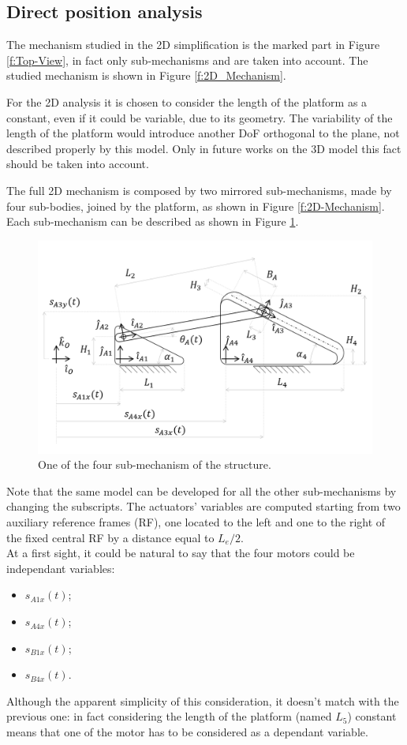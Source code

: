 \documentclass[10.5pt, twocolumn]{article}
\newcommand*\circled[1]{\tikz[baseline=(char.base)]{
  \node[shape=circle,draw,inner sep=2pt] (char) {#1};}}
\begin{document}
\subsection{Direct position analysis}
\label{s:Direct-position}
The mechanism studied in the 2D simplification is the marked part in Figure \ref{f:Top-View}, in fact only sub-mechanisms \circled{A} and \circled{B} are taken into account. The studied mechanism is shown in Figure \ref{f:2D_Mechanism}.

For the 2D analysis it is chosen to consider the length of the platform as a constant, even if it could be variable, due to its geometry. The variability of the length of the platform would introduce another DoF orthogonal to the plane, not described properly by this model. Only in future works on the 3D model this fact should be taken into account.

The full 2D mechanism is composed by two mirrored sub-mechanisms, made by four sub-bodies, joined by the platform, as shown in Figure \ref{f:2D-Mechanism}. Each sub-mechanism can be described as shown in Figure \ref{f:Sub-Mechanism}.
\begin{figure}[h!]
  \centering
  \includegraphics[width=12cm]{Images/Sub-Mechanism}
  \caption{One of the four sub-mechanism of the structure.}
  \label{f:Sub-Mechanism}
\end{figure}
Note that the same model can be developed for all the other sub-mechanisms by changing the subscripts.
The actuators' variables are computed starting from two auxiliary reference frames (RF), one located to the left and one to the right of the fixed central RF by a distance equal to \(L_e/2\).\\
At a first sight, it could be natural to say that the four motors could be independant variables:
\begin{itemize}
  \item \( s_{A1x}(t) \);
  \item \( s_{A4x}(t) \);
  \item \( s_{B1x}(t) \);
  \item \( s_{B4x}(t) \).
\end{itemize}
Although the apparent simplicity of this consideration, it doesn't match with the previous one: in fact considering the length of the platform (named \( L_5\)) constant means that one of the motor has to be considered as a dependant variable.
\end{document}
